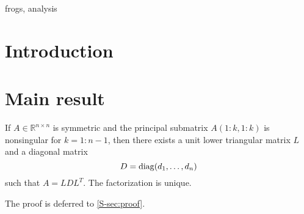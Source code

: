 \documentclass[review]{siamart}
\begin{document}
\TitleAndAuthorCommands
\maketitle

\PageHeaderCommands

\begin{abstract}
  \lipsum[1]
\end{abstract}

\begin{keywords}
  frogs, analysis
\end{keywords}

\section{Introduction}
\lipsum[2-3]

\section{Main result}
\lipsum[4-5]

\begin{theorem}\label{thm:bigthm}
  If $A \in \mathbb{R}^{n \times n}$ is symmetric and the principal submatrix $A(1:k,1:k)$ is nonsingular for $k=1:n-1$, then there exists a unit lower triangular matrix $L$ and a diagonal matrix 
  \begin{displaymath}
    D = \diag(d_1,\dots,d_n)
  \end{displaymath}
  such that $A=LDL^T$. The factorization is unique.
\end{theorem}

The proof is deferred to \cref{S-sec:proof}.

\lipsum[6]



\end{document}
